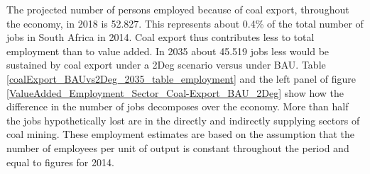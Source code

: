 \documentclass[12pt,english]{article}
\begin{document}

The projected number of persons employed because of coal export, throughout the economy, in 2018 is 52.827. This represents about 0.4\% of the total number of jobs in South Africa in 2014. Coal export thus contributes less to total employment than to value added. In 2035 about 45.519 jobs less would be sustained by coal export under a 2Deg scenario versus under BAU. Table \ref{coalExport_BAUvs2Deg_2035_table_employment} and the left panel of figure \ref{ValueAdded_Employment_Sector_Coal-Export_BAU_2Deg} show how the difference in the number of jobs decomposes over the economy. More than half the jobs hypothetically lost are in the directly and indirectly supplying sectors of coal mining. These employment estimates are based on the assumption that the number of employees per unit of output is constant throughout the period and equal to figures for 2014. 
\end{document}
